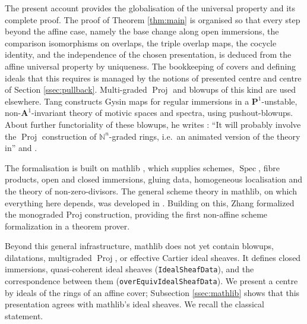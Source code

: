 \documentclass[pdflatex,sn-mathphys-num]{sn-jnl}
\theoremstyle{plain}
\theoremstyle{definition}
\newcommand{\Spec}{\operatorname{Spec}}
\newcommand{\Proj}{\operatorname{Proj}}
\newcommand{\Nat}{\mathbb{N}}
\begin{document}
The present account provides the globalisation of the universal property and its complete proof. The
proof of Theorem \ref{thm:main} is organised so that every step beyond the
affine case, namely the base change along open immersions, the comparison
isomorphisms on overlaps, the triple overlap maps, the cocycle identity, and
the independence of the chosen presentation, is deduced from the affine
universal property by uniqueness. The bookkeeping of covers and defining ideals that this requires is
managed by the notions of presented centre and centre of Section
\ref{ssec:pullback}.
Multi-graded $\Proj$ and blowups of this kind are used elsewhere. Tang
\cite{tang} constructs Gysin maps for regular immersions in a
$\mathbf{P}^1$-unstable, non-$\mathbf{A}^1$-invariant theory of motivic spaces
and spectra, using pushout-blowups. About further functoriality of these blowups, he writes
\cite[Remark~A.32]{tang}: ``It will probably involve the $\Proj$ construction of
$\Nat^n$-graded rings, i.e.\ an animated version of the theory in''
\cite{brenner-schroer} and \cite{mayeux-riche}.

The formalisation is built on mathlib \cite{mathlib}, which supplies schemes,
$\Spec$, fibre products, open and closed immersions, gluing data, homogeneous
localisation and the theory of non-zero-divisors. The general scheme theory in mathlib, on which everything here depends, was developed in \cite{buzzard-schemes}. Building on this, Zhang \cite{zhang-proj} formalized the monograded Proj construction, providing the first non-affine scheme formalization in a theorem prover.

Beyond this general infrastructure, mathlib does not yet contain blowups,
dilatations, multigraded $\Proj$, or effective Cartier ideal sheaves. It
defines closed immersions, quasi-coherent ideal sheaves
(\texttt{IdealSheafData}), and the correspondence between them
(\texttt{overEquivIdealSheafData}). We present a centre by ideals of the rings
of an affine cover; Subsection \ref{ssec:mathlib} shows that this presentation
agrees with mathlib's ideal sheaves. We recall the classical statement.
\end{document}
